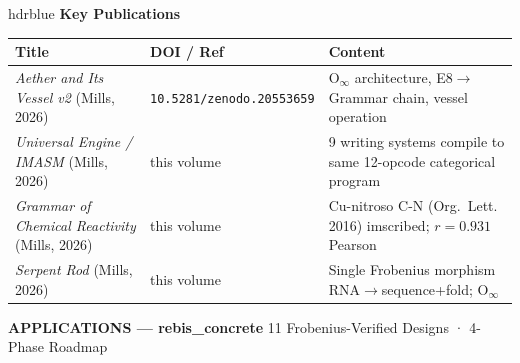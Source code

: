 \documentclass[10pt,a4paper]{article}
\begin{document}
\vspace{4pt}
\begin{sectionbox}{hdrblue}
{\small\bfseries\color{hdrblue} Key Publications} \\[2pt]
{\small
\begin{tabular}{@{}l l p{5.5cm}@{}}
\toprule
\textbf{Title} & \textbf{DOI / Ref} & \textbf{Content} \\
\midrule
\textit{Aether and Its Vessel v2} (Mills, 2026) & \texttt{\small 10.5281/zenodo.20553659} & {\scriptsize O$_\infty$ architecture, E8$\to$Grammar chain, vessel operation} \\
\textit{Universal Engine / IMASM} (Mills, 2026) & this volume & {\scriptsize 9 writing systems compile to same 12-opcode categorical program} \\
\textit{Grammar of Chemical Reactivity} (Mills, 2026) & this volume & {\scriptsize Cu-nitroso C-N (Org.~Lett. 2016) imscribed; $r=0.931$ Pearson} \\
\textit{Serpent Rod} (Mills, 2026) & this volume & {\scriptsize Single Frobenius morphism RNA$\to${sequence+fold}; O$_\infty$} \\
\bottomrule
\end{tabular}}
\end{sectionbox}

\newpage

\begin{headerbox}
  {\Large\bfseries\color{white} APPLICATIONS — rebis\_concrete}
  \hfill{\normalsize\color{white!80!hdrblue} 11 Frobenius-Verified Designs · 4-Phase Roadmap}
\end{headerbox}
\end{document}
